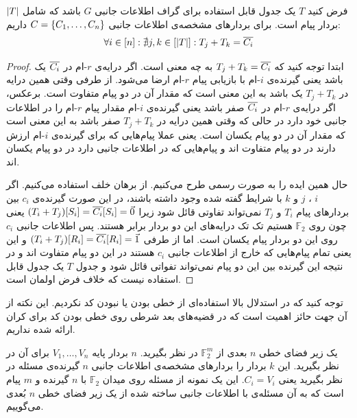 \begin{lemma}
	\label{lemma:tableconstraint}
	فرض کنید
	$T$
	یک جدول قابل استفاده برای گراف اطلاعات جانبی
	$G$
	باشد که شامل
	$\left|{T}\right|$
	بردار پیام است. برای بردارهای مشخصه‌ی اطلاعات جانبی
	$C = \left\{ C_1, \ldots, C_n \right\}$
	داریم:
	\begin{align}
		\forall i \in [n]: \nexists j, k \in [\left|{T}\right|]: T_j + T_k = \overline{C_i}
	\end{align}
\end{lemma}
\begin{proof}
	ابتدا توجه کنید که
	$T_j + T_k = \overline{C_i}$
	به چه معنی است. اگر درایه‌ی
	$r$-ام
	در
	$\overline{C_i}$
	یک باشد یعنی گیرنده‌ی
	$i$-ام
	با بازیابی پیام
	$r$-ام
	ارضا می‌شود. از طرفی وقتی همین درایه در
	$T_j + T_k$
	یک باشد به این معنی است که مقدار آن در دو پیام متفاوت است. برعکس، اگر درایه‌ی 
	$r$-ام
	در
	$\overline{C_i}$
	صفر باشد یعنی گیرنده‌ی $i$-ام
	مقدار پیام
	$r$-ام
	را در اطلاعات جانبی خود دارد در حالی که وقتی همین درایه در
	$T_j + T_k$
	صفر باشد به این معنی است که مقدار آن در دو پیام یکسان است. یعنی عملا پیام‌هایی که برای گیرنده‌ی
	$i$-ام
	ارزش دارند در دو پیام متفاوت اند و پیام‌هایی که در اطلاعات جانبی دارد در دو پیام یکسان اند.
	
	حال همین ایده را به صورت رسمی طرح می‌کنیم. از برهان خلف استفاده می‌کنیم. اگر
	$i$
	،
	$j$
	و
	$k$
	با شرایط گفته شده وجود داشته باشند، در این صورت گیرنده‌ی
	$c_i$
	بین بردارهای پیام
	$T_i$
	و
	$T_j$
	نمی‌تواند تفاوتی قائل شود زیرا
	$(T_i + T_j)[S_i] = \overline{C_i}[S_i] = \vec{0}$
	یعنی چون روی
	$\mathbb{F}_2$
	هستیم تک تک درایه‌های این دو بردار برابر هستند. پس اطلاعات جانبی
	$c_i$
	روی این دو بردار پیام یکسان است. اما از طرفی
	$(T_i + T_j)[R_i] = \overline{C_i}[R_i] = \vec{1}$
	و این یعنی تمام پیام‌هایی که خارج از اطلاعات جانبی
	$c_i$
	هستند در این دو پیام متفاوت اند و در نتیجه این گیرنده بین این دو پیام نمی‌تواند تفواتی قائل شود و جدول
	$T$
	یک جدول قابل استفاده نیست که خلاف فرض اولمان است.
\end{proof}
\begin{remark}
توجه کنید که در استدلال بالا استفاده‌ای از خطی بودن یا نبودن کد نکردیم. این نکته از آن جهت حائز اهمیت است که در قضیه‌های بعد شرطی روی خطی بودن کد برای کران ارائه شده نداریم.
\end{remark}
\begin{definition}
	 یک زیر فضای خطی 
	$n$
	بعدی از
	$\mathbb{F}^m_2$
	در نظر بگیرید.
	$n$
	بردار پایه
	$V_1, \ldots, V_n$
	برای آن در نظر بگیرید. این 
	$k$
	بردار را بردارهای مشخصه‌ی اطلاعات جانبی 
	$n$
	گیرنده‌ی مسئله در نظر بگیرید یعنی
	$C_i = V_i$.
	این یک نمونه از مسئله
	\picod
	روی میدان
	$\mathbb{F}_2$
	با
	$n$
	گیرنده و 
	$m$
	پیام است که به آن مسئله‌ی 
	\picod
	با اطلاعات جانبی ساخته شده از یک زیر فضای خطی
	$n$
	بُعدی می‌گوییم.
\end{definition}

